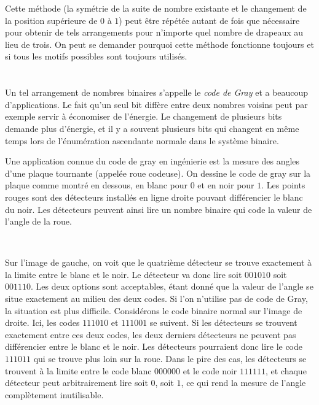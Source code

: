{{Cette méthode (la symétrie de la suite de nombre existante et le changement de la position supérieure de $0$ à $1$) peut être répétée autant de fois que nécessaire pour obtenir de tels arrangements pour n’importe quel nombre de drapeaux au lieu de trois. On peut se demander pourquoi cette méthode fonctionne toujours et si tous les motifs possibles sont toujours utilisés.



\section*{\BrochureItsInformatics}
Un tel arrangement de nombres binaires s’appelle le \emph{code de Gray} et a beaucoup d’applications. Le fait qu’un seul bit diffère entre deux nombres voisins peut par exemple servir à économiser de l’énergie. Le changement de plusieurs bits demande plus d’énergie, et il y a souvent plusieurs bits qui changent en même temps lors de l’énumération ascendante normale dans le système binaire.

Une application connue du code de gray en ingénierie est la mesure des angles d’une plaque tournante (appelée roue codeuse). On dessine le code de gray sur la plaque comme montré en dessous, en blanc pour $0$ et en noir pour $1$. Les points rouges sont des détecteurs installés en ligne droite pouvant différencier le blanc du noir. Les détecteurs peuvent ainsi lire un nombre binaire qui code la valeur de l’angle de la roue.

{\centering%
\raisebox{-0.5ex}{}~~~
\raisebox{-0.5ex}{}\par}

Sur l’image de gauche, on voit que le quatrième détecteur se trouve exactement à la limite entre le blanc et le noir. Le détecteur va donc lire soit $001010$ soit $001110$. Les deux options sont acceptables, étant donné que la valeur de l’angle se situe exactement au milieu des deux codes. Si l’on n’utilise pas de code de Gray, la situation est plus difficile. Considérons le code binaire normal sur l’image de droite. Ici, les codes $111010$ et $111001$ se suivent. Si les détecteurs se trouvent exactement entre ces deux codes, les deux derniers détecteurs ne peuvent pas différencier entre le blanc et le noir. Les détecteurs pourraient donc lire le code $111011$ qui se trouve plus loin sur la roue. Dans le pire des cas, les détecteurs se trouvent à la limite entre le code blanc $000000$ et le code noir $111111$, et chaque détecteur peut arbitrairement lire soit $0$, soit $1$, ce qui rend la mesure de l’angle complètement inutilisable.



}}
